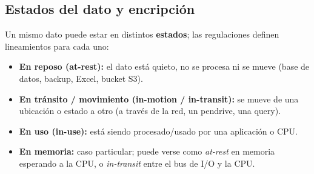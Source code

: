\documentclass[../main.tex]{subfiles}
\begin{document}
\subsection{Estados del dato y encripción}

Un mismo dato puede estar en distintos \textbf{estados}; las regulaciones definen
lineamientos para cada uno:
\begin{itemize}[nosep]
  \item \textbf{En reposo (at-rest):} el dato está quieto, no se procesa ni se mueve
        (base de datos, backup, Excel, bucket S3).
  \item \textbf{En tránsito / movimiento (in-motion / in-transit):} se mueve de una
        ubicación o estado a otro (a través de la red, un pendrive, una query).
  \item \textbf{En uso (in-use):} está siendo procesado/usado por una aplicación o CPU.
  \item \textbf{En memoria:} caso particular; puede verse como \emph{at-rest} en memoria
        esperando a la CPU, o \emph{in-transit} entre el bus de I/O y la CPU.
\end{itemize}
\end{document}
